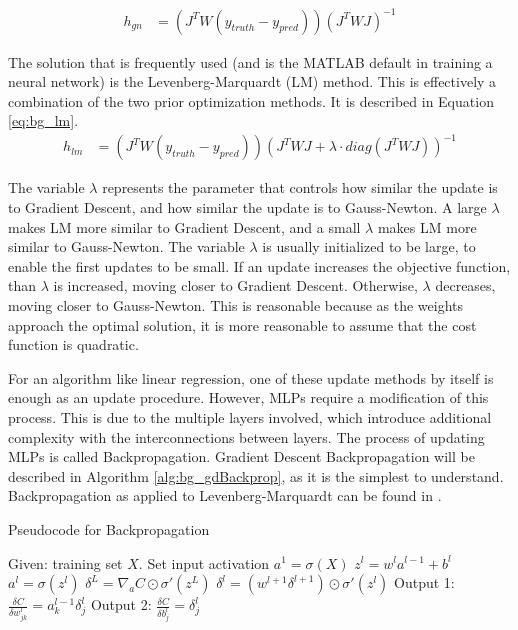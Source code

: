 	\begin{align}
		h_{gn} &= (J^TW(y_{truth}-y_{pred}))(J^T WJ)^{-1} \label{eq:bg_gaussNewton}
	\end{align}
	\par The solution that is frequently used (and is the MATLAB default in training a neural network) is the Levenberg-Marquardt (LM) method\cite{lm_alg}. This is effectively a combination of the two prior optimization methods. It is described in Equation \ref{eq:bg_lm}. 
	\begin{align}
		h_{lm} &= (J^TW(y_{truth}-y_{pred}))(J^T WJ + \lambda \cdot diag(J^T WJ))^{-1} \label{eq:bg_lm}
	\end{align}
	\par The variable $\lambda$ represents the parameter that controls how similar the update is to Gradient Descent, and how similar the update is to Gauss-Newton. A large $\lambda$ makes LM more similar to Gradient Descent, and a small $\lambda$ makes LM more similar to Gauss-Newton. The variable $\lambda$ is usually initialized to be large, to enable the first updates to be small. If an update increases the objective function, than $\lambda$ is increased, moving closer to Gradient Descent. Otherwise, $\lambda$ decreases, moving closer to Gauss-Newton. This is reasonable because as the weights approach the optimal solution, it is more reasonable to assume that the cost function is quadratic.
	\par For an algorithm like linear regression, one of these update methods by itself is enough as an update procedure. However, MLPs require a modification of this process. This is due to the multiple layers involved, which introduce additional complexity with the interconnections between layers. The process of updating MLPs is called Backpropagation. Gradient Descent Backpropagation will be described in Algorithm \ref{alg:bg_gdBackprop}, as it is the simplest to understand. Backpropagation as applied to Levenberg-Marquardt can be found in \cite{placeholderCitation}.
	\begin{algorithm}
		\caption{Pseudocode for Backpropagation}
		\label{alg:bg_gdBackprop}
		\begin{algorithmic}[1]
			\State Given: training set $X$.
			\State Set input activation $a^1=\sigma(X)$
			\State $z^l = w^l a^{l-1} +b^l$
			\State $a^l = \sigma(z^l)$ 
			\EndFor
			\State $\delta^L = \nabla_a C \odot \sigma '(z^L)$
			\State $\delta^l = (w^{l+1}\delta^{l+1}) \odot \sigma '(z^l)$
			\EndFor
			\State Output 1: $\frac{\delta C}{\delta w^{l}_{jk}} = a^{l-1}_{k}\delta^{l}_{j}$
			\State Output 2: $\frac{\delta C}{\delta b^{l}_{j}} = \delta^{l}_{j}$
			\EndProcedure
		\end{algorithmic}
	\end{algorithm}
